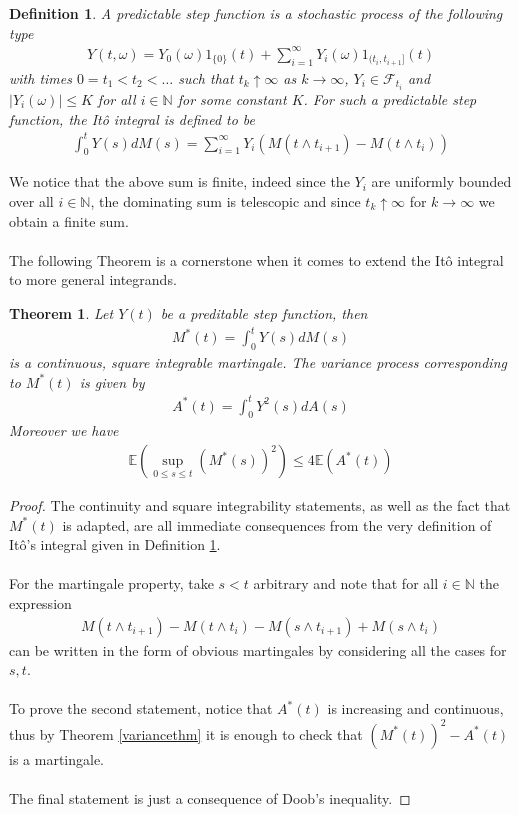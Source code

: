 \documentclass[11pt,a4paper, final]{article}
\newtheorem{thm}{Theorem}[section]
\newtheorem{defn}{Definition}[section]
\begin{document}
\begin{defn} \label{defitopredictable} A predictable step function is a stochastic process of the following type
\begin{align*}
Y(t, \omega) = Y_0 ( \omega)1_{\{0\}} (t) + \sum_{i=1}^\infty Y_i( \omega) 1_{(t_i,t_{i+1}]}(t)
\end{align*}
with times $0=t_1 < t_2 < \dots $ such that $t_k \uparrow \infty$ as $k \to \infty$, $Y_i \in \mathcal{F}_{t_i}$ and $|Y_i( \omega)| \leq K$ for all $i \in \mathbb{N}$ for some constant $K$. 
For such a predictable step function, the Itô integral is defined to be 
\begin{align*}
\int_0^t Y(s) dM(s) = \sum_{i=1}^\infty Y_i  (M(t \wedge t_{i+1}) - M(t \wedge t_i))
\end{align*}
\end{defn}
\noindent We notice that the above sum is finite, indeed since the $Y_i$ are uniformly bounded over all $i \in \mathbb{N}$, the dominating sum is telescopic and since $t_k \uparrow \infty$ for $k \to \infty$ we obtain a finite sum.
\\
\\
The following Theorem is a cornerstone when it comes to extend the Itô integral to more general integrands.
\newpage
\begin{thm} \label{thminequalty} Let $Y(t)$ be a preditable step function, then
\begin{align*}
M^*(t) = \int_0^t Y(s) dM(s)
\end{align*}
is a continuous, square integrable martingale. The variance process corresponding to $M^*(t)$ is given by
\begin{align*}
A^*(t) = \int_0^t Y^2(s) dA(s)
\end{align*}
Moreover we have
\begin{align*}
\mathbb{E}\left( \sup_{0 \leq s \leq t} (M^*(s))^2 \right) \leq 4 \mathbb{E}(A^*(t))
\end{align*}
\end{thm}
\begin{proof}
The continuity and square integrability statements, as well as the fact that $M^*(t)$ is adapted, are all immediate consequences from the very definition of Itô's integral given in Definition \ref{defitopredictable}.
\\\\
For the martingale property, take $s < t$ arbitrary and note that for all $i \in \mathbb{N}$ the expression
\begin{align*}
M(t \wedge t_{i+1}) - M(t \wedge t_i) - M (s \wedge t_{i+1}) + M( s \wedge t_i)
\end{align*}
can be written in the form of obvious martingales by considering all the cases for $s,t$. 
\\\\
To prove the second statement, notice that $A^*(t)$ is increasing and continuous, thus by Theorem \ref{variancethm} it is enough to check that $(M^*(t))^2 - A^*(t)$ is a martingale. 
\\\\
The final statement is just a consequence of Doob's inequality. 
\end{proof}
\end{document}
